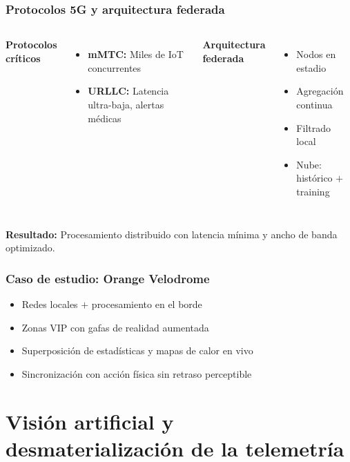 \documentclass[aspectratio=169]{beamer}
\begin{document}
\begin{frame}\frametitle{Protocolos 5G y arquitectura federada}
\begin{columns}[T]
\textbf{Protocolos críticos}
\begin{itemize}
    \item \textbf{mMTC:} Miles de IoT concurrentes
    \item \textbf{URLLC:} Latencia ultra-baja, alertas médicas
\end{itemize}

\textbf{Arquitectura federada}
\begin{itemize}
    \item Nodos en estadio
    \item Agregación continua
    \item Filtrado local
    \item Nube: histórico $+$ training
\end{itemize}
\end{columns}
\textbf{Resultado:} Procesamiento distribuido con latencia mínima y ancho de banda optimizado.
\end{frame}

\begin{frame}\frametitle{Caso de estudio: Orange Velodrome}
\begin{itemize}
    \item Redes locales $+$ procesamiento en el borde
    \item Zonas VIP con gafas de realidad aumentada
    \item Superposición de estadísticas y mapas de calor en vivo
    \item Sincronización con acción física sin retraso perceptible
\end{itemize}
\end{frame}

\section{Visión artificial y desmaterialización de la telemetría}
\frame{\sectionpage}
\end{document}

